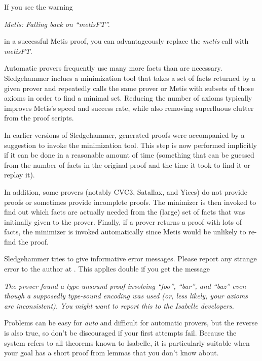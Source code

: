 \documentclass[a4paper,12pt]{article}
\begin{document}
If you see the warning

\prew
\slshape
Metis: Falling back on ``\textit{metisFT\/}''.
\postw

in a successful Metis proof, you can advantageously replace the \textit{metis}
call with \textit{metisFT}.


Automatic provers frequently use many more facts than are necessary.
Sledgehammer inclues a minimization tool that takes a set of facts returned by a
given prover and repeatedly calls the same prover or Metis with subsets of those
axioms in order to find a minimal set. Reducing the number of axioms typically
improves Metis's speed and success rate, while also removing superfluous clutter
from the proof scripts.

In earlier versions of Sledgehammer, generated proofs were accompanied by a
suggestion to invoke the minimization tool. This step is now performed
implicitly if it can be done in a reasonable amount of time (something that can
be guessed from the number of facts in the original proof and the time it took
to find it or replay it).

In addition, some provers (notably CVC3, Satallax, and Yices) do not provide
proofs or sometimes provide incomplete proofs. The minimizer is then invoked to
find out which facts are actually needed from the (large) set of facts that was
initinally given to the prover. Finally, if a prover returns a proof with lots
of facts, the minimizer is invoked automatically since Metis would be unlikely
to re-find the proof.


Sledgehammer tries to give informative error messages. Please report any strange
error to the author at \authoremail. This applies double if you get the message

\prew
\slshape
The prover found a type-unsound proof involving ``\textit{foo}'',
``\textit{bar}'', and ``\textit{baz}'' even though a supposedly type-sound
encoding was used (or, less likely, your axioms are inconsistent). You might
want to report this to the Isabelle developers.
\postw


Problems can be easy for \textit{auto} and difficult for automatic provers, but
the reverse is also true, so don't be discouraged if your first attempts fail.
Because the system refers to all theorems known to Isabelle, it is particularly
suitable when your goal has a short proof from lemmas that you don't know about.
\end{document}
